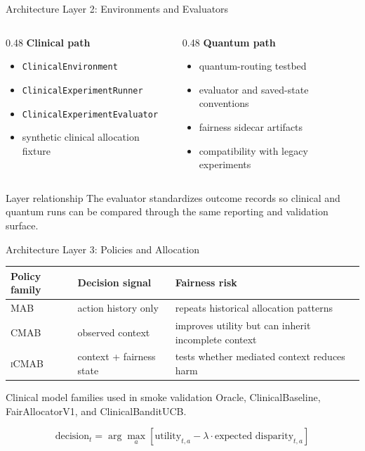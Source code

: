 \documentclass[aspectratio=169,10pt]{beamer}
\newcommand{\mab}{\textsc{MAB}}
\newcommand{\cmab}{\textsc{CMAB}}
\newcommand{\icmab}{\textsc{iCMAB}}
\begin{document}
\begin{frame}{Architecture Layer 2: Environments and Evaluators}
\begin{columns}[T]
\begin{column}{0.48\textwidth}
\textbf{Clinical path}
\begin{itemize}
    \item \texttt{ClinicalEnvironment}
    \item \texttt{ClinicalExperimentRunner}
    \item \texttt{ClinicalExperimentEvaluator}
    \item synthetic clinical allocation fixture
\end{itemize}
\end{column}
\begin{column}{0.48\textwidth}
\textbf{Quantum path}
\begin{itemize}
    \item quantum-routing testbed
    \item evaluator and saved-state conventions
    \item fairness sidecar artifacts
    \item compatibility with legacy experiments
\end{itemize}
\end{column}
\end{columns}
\begin{block}{Layer relationship}
The evaluator standardizes outcome records so clinical and quantum runs can be compared through the same reporting and validation surface.
\end{block}
\end{frame}

\begin{frame}{Architecture Layer 3: Policies and Allocation}
\begin{center}
\begin{tabular}{p{}p{}p{}}
\toprule
Policy family & Decision signal & Fairness risk \\
\midrule
\mab & action history only & repeats historical allocation patterns \\
\cmab & observed context & improves utility but can inherit incomplete context \\
\icmab & context + fairness state & tests whether mediated context reduces harm \\
\bottomrule
\end{tabular}
\end{center}
\begin{block}{Clinical model families used in smoke validation}
Oracle, ClinicalBaseline, FairAllocatorV1, and ClinicalBanditUCB.
\end{block}
\begin{equation*}
\text{decision}_t = \arg\max_a \left[\text{utility}_{t,a} - \lambda \cdot \text{expected disparity}_{t,a}\right]
\end{equation*}
\end{frame}
\end{document}
